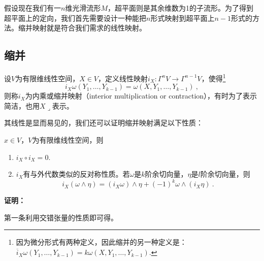 

\begin{issues}
\issueTODO
\end{issues}
假设现在我们有一$n$维光滑流形$M$，超平面则是其余维数为1的子流形。为了得到超平面上的定向，我们首先需要设计一种能把$n$形式映射到超平面上$n-1$形式的方法。缩并映射就是符合我们需求的线性映射。
\subsection{缩并}
\begin{definition}{}
设$V$为有限维线性空间，$X\in V$，定义线性映射$i_X:\Gamma^n V\rightarrow\Gamma^{n-1}V$，使得\footnote{因为微分形式有两种定义，因此缩并的另一种定义是：$\overline{i}_X\omega(Y_1,\ldots,Y_{k-1})=k\omega(X,Y_1,\ldots,Y_{k-1}).$}
\begin{equation}
i_X\omega(Y_1,\ldots,Y_{k-1})=\omega(X,Y_1,\ldots,Y_{k-1})~,
\end{equation}
则称$i_X$为内乘或缩并映射（interior multiplication or contraction），有时为了表示简洁，也用$X\lrcorner$表示。
\end{definition}
其线性是显而易见的，我们还可以证明缩并映射满足以下性质：
\begin{lemma}{}
$x\in V$，$V$为有限维线性空间，则
\begin{enumerate}
\item $i_X\circ i_X=0$.
\item $i_X$有与外代数类似的反对称性质。若$\omega$是$k$阶余切向量，$\eta$是$l$阶余切向量，则
\begin{equation}\label{eq_orihyp_1}
i_X(\omega\wedge\eta)=(i_X\omega)\wedge\eta+(-1)^k\omega\wedge(i_X\eta)~.
\end{equation}
\end{enumerate}
\end{lemma}
\textbf{证明：}

第一条利用交错张量的性质即可得。

